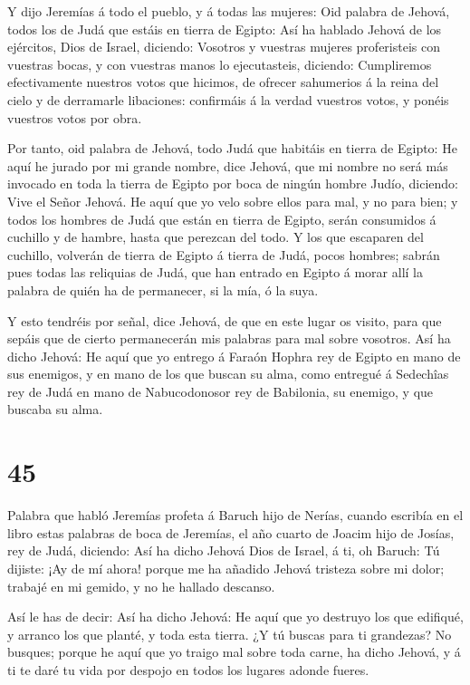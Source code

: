 Y dijo Jeremías á todo el pueblo, y á todas las mujeres:
Oid palabra de Jehová, todos los de Judá que estáis en tierra de Egipto:
 Así ha hablado Jehová de los ejércitos, Dios de Israel,
diciendo: Vosotros y vuestras mujeres proferisteis con vuestras bocas, y
con vuestras manos lo ejecutasteis, diciendo: Cumpliremos efectivamente
nuestros votos que hicimos, de ofrecer sahumerios á la reina del cielo y
de derramarle libaciones: confirmáis á la verdad vuestros votos, y
ponéis vuestros votos por obra.

 Por tanto, oid palabra de Jehová, todo Judá que habitáis
en tierra de Egipto: He aquí he jurado por mi grande nombre, dice
Jehová, que mi nombre no será más invocado en toda la tierra de Egipto
por boca de ningún hombre Judío, diciendo: Vive el Señor Jehová.
 He aquí que yo velo sobre ellos para mal, y no para bien;
y todos los hombres de Judá que están en tierra de Egipto, serán
consumidos á cuchillo y de hambre, hasta que perezcan del todo.
 Y los que escaparen del cuchillo, volverán de tierra de
Egipto á tierra de Judá, pocos hombres; sabrán pues todas las reliquias
de Judá, que han entrado en Egipto á morar allí la palabra de quién ha
de permanecer, si la mía, ó la suya.

 Y esto tendréis por señal, dice Jehová, de que en este
lugar os visito, para que sepáis que de cierto permanecerán mis palabras
para mal sobre vosotros.  Así ha dicho Jehová: He aquí que
yo entrego á Faraón Hophra rey de Egipto en mano de sus enemigos, y en
mano de los que buscan su alma, como entregué á Sedechîas rey de Judá en
mano de Nabucodonosor rey de Babilonia, su enemigo, y que buscaba su
alma.

\hypertarget{section-44}{%
\section{45}\label{section-44}}

 Palabra que habló Jeremías profeta á Baruch hijo de Nerías,
cuando escribía en el libro estas palabras de boca de Jeremías, el año
cuarto de Joacim hijo de Josías, rey de Judá, diciendo:  Así
ha dicho Jehová Dios de Israel, á ti, oh Baruch:  Tú
dijiste: ¡Ay de mí ahora! porque me ha añadido Jehová tristeza sobre mi
dolor; trabajé en mi gemido, y no he hallado descanso.

 Así le has de decir: Así ha dicho Jehová: He aquí que yo
destruyo los que edifiqué, y arranco los que planté, y toda esta tierra.
 ¿Y tú buscas para ti grandezas? No busques; porque he aquí
que yo traigo mal sobre toda carne, ha dicho Jehová, y á ti te daré tu
vida por despojo en todos los lugares adonde fueres.

